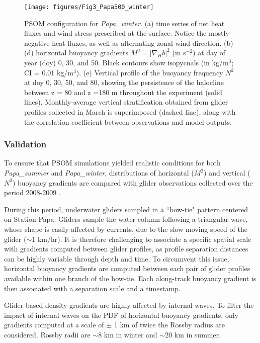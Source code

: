 \documentclass[draft,linenumbers]{agujournal2018}
\begin{document}
\begin{figure}[ht]
	\texttt{[image: figures/Fig3\_Papa500\_winter]}
	\caption{PSOM configuration for \textit{Papa\_winter}. (a) time series of net heat fluxes and wind stress prescribed at the surface. Notice the mostly negative heat fluxes, as well as alternating zonal wind direction. (b)-(d) horizontal buoyancy gradients $M^2 = |\nabla_Hb|^2$ (in s$^{-2}$) at day of year (doy) 0, 30, and 50. Black contours show isopycnals (in kg/m$^3$; CI = 0.01 kg/m$^3$). (e) Vertical profile of the buoyancy frequency $N^2$ at doy 0, 30, 50, and 80, showing the persistence of the halocline between z = 80 and z =180 m throughout the experiment (solid lines). Monthly-average vertical stratification obtained from glider profiles collected in March is superimposed (dashed line), along with the correlation coefficient between observations and model outputs.}
	\label{fig: Papa_winter}
\end{figure}


\subsubsection{Validation}
\label{sec: glider_validation}

To ensure that PSOM simulations yielded realistic conditions for both \textit{Papa\_summer} and \textit{Papa\_winter}, distributions of horizontal ($M^2$) and vertical ($N^2$) buoyancy gradients are compared with glider observations collected over the period 2008-2009 \citep{Pelland_2016}.

During this period, underwater gliders sampled in a ``bow-tie" pattern centered on Station Papa. Gliders sample the water column following a triangular wave, whose shape is easily affected by currents, due to the slow moving speed of the glider ($\sim$1 km/hr). It is therefore challenging to associate a specific spatial scale with gradients computed between glider profiles, as profile separation distances can be highly variable through depth and time. To circumvent this issue, horizontal buoyancy gradients are computed between each pair of glider profiles available within one branch of the bow-tie. Each along-track buoyancy gradient is then associated with a separation scale and a timestamp. 

 Glider-based density gradients are highly affected by internal waves. To filter the impact of internal waves on the PDF of horizontal buoyancy gradients, only gradients computed at a scale of $\pm$ 1 km of twice the Rossby radius are considered. Rossby radii are $\sim 8$ km in winter and $\sim 20$ km in summer.
 
\end{document}
